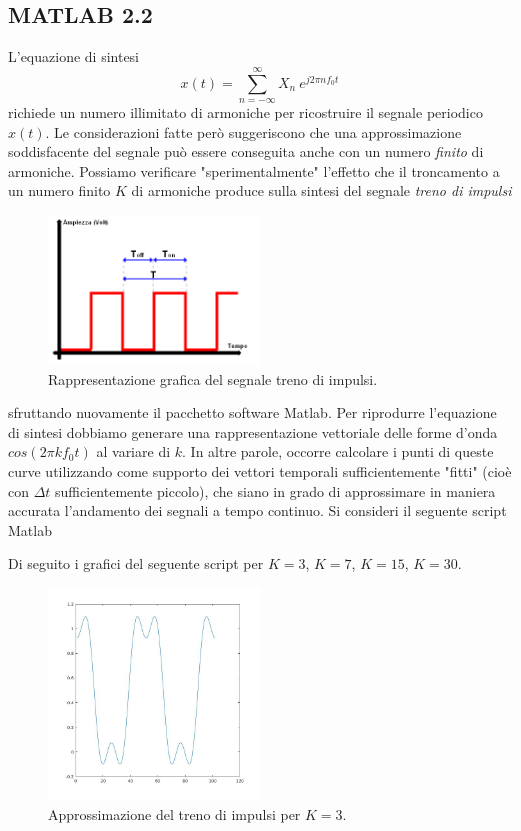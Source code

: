 \documentclass[12pt,oneside,openany]{memoir}
\numberwithin{equation}{subsection}
\begin{document}
\subsection{MATLAB 2.2}
L'equazione di sintesi 
\begin{equation}\label{eq:fourier_series_complex_form}
	x(t) = \sum_{n = -\infty}^{\infty} X_n \ e^{j 2 \pi n f_0 t}
\end{equation}
richiede un numero illimitato di armoniche per ricostruire il segnale periodico $x(t)$. Le considerazioni fatte per\`o suggeriscono che una approssimazione soddisfacente del segnale pu\`o essere conseguita anche con un numero \textit{finito} di armoniche. Possiamo verificare "sperimentalmente" l'effetto che il troncamento a un numero finito $K$ di armoniche produce sulla sintesi del segnale \textit{treno di impulsi}
\begin{figure}[H]
\centering
\captionsetup{justification=centering}
\includegraphics[width=0.5\textwidth]{images/treno_di_impulsi.png}
\caption{Rappresentazione grafica del segnale treno di impulsi.}
\end{figure}
sfruttando nuovamente il pacchetto software Matlab. Per riprodurre l'equazione di sintesi dobbiamo generare una rappresentazione vettoriale delle forme d'onda $cos(2 \pi k f_0 t)$ al variare di $k$. In altre parole, occorre calcolare i punti di queste curve utilizzando come supporto dei vettori temporali sufficientemente "fitti" (cio\`e con $\Delta t$ sufficientemente piccolo), che siano in grado di approssimare in maniera accurata l'andamento dei segnali a tempo continuo.
Si consideri il seguente script Matlab

Di seguito i grafici del seguente script per $K = 3$, $K = 7$, $K = 15$, $K = 30$.
\begin{figure}[H]
\centering
\captionsetup{justification=centering}
\includegraphics[width=0.5\textwidth]{images/matlab_approssimazione_1.jpg}
\caption{Approssimazione del treno di impulsi per $K = 3$.}
\end{figure}
\end{document}
